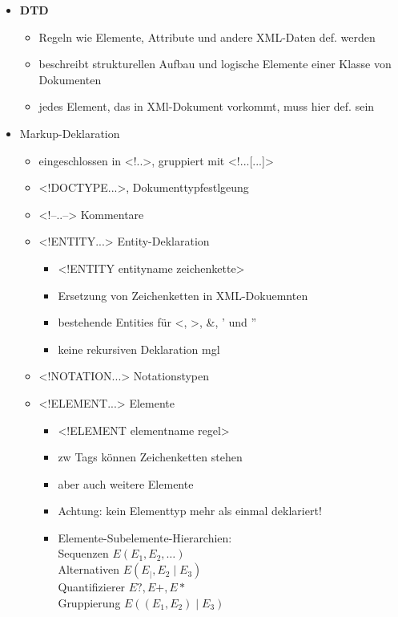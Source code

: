 \begin{itemize}
	\item \textbf{DTD}
	\begin{itemize}
		\item Regeln wie Elemente, Attribute und andere XML-Daten def. werden
		\item beschreibt strukturellen Aufbau und logische Elemente einer Klasse von Dokumenten
		\item jedes Element, das in XMl-Dokument vorkommt, muss hier def. sein
	\end{itemize}
	\item Markup-Deklaration
	\begin{itemize}
		\item eingeschlossen in <!..>, gruppiert mit <!...[...]>
		\item <!DOCTYPE...>, Dokumenttypfestlgeung
		\item <!--..--> Kommentare
		\item <!ENTITY...> Entity-Deklaration
		\begin{itemize}
			\item <!ENTITY entityname zeichenkette>
			\item Ersetzung von Zeichenketten in XML-Dokuemnten
			\item bestehende Entities für <, >, \&, ' und ''
			\item keine rekursiven Deklaration mgl
		\end{itemize}
		\item <!NOTATION...> Notationstypen
		\item <!ELEMENT...> Elemente
		\begin{itemize}
			\item <!ELEMENT elementname regel>
			\item zw Tags können Zeichenketten stehen
			\item aber auch weitere Elemente
			\item Achtung: kein Elementtyp mehr als einmal deklariert!
			\item Elemente-Subelemente-Hierarchien:\\
			Sequenzen $E (E_1, E_2, \ldots)$\\
			Alternativen $E (E_ \mid, E_2 \mid E_3)$\\
			Quantifizierer $E?, E+, E*$\\
			Gruppierung $E ((E_1, E_2) \mid E_3)$
			

\end{itemize}
\end{itemize}
\end{itemize}
